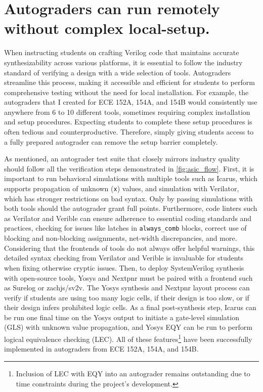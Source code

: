 \section{Autograders can run remotely without complex local-setup.}
\label{section:complex_tool_setups}

When instructing students on crafting Verilog code that maintains accurate synthesizability across various platforms, it is essential to follow the industry standard of verifying a design with a wide selection of tools. Autograders streamline this process, making it accessible and efficient for students to perform comprehensive testing without the need for local installation. For example, the autograders that I created for ECE 152A, 154A, and 154B would consistently use anywhere from 6 to 10 different tools, sometimes requiring complex installation and setup procedures. Expecting students to complete these setup procedures is often tedious and counterproductive. Therefore, simply giving students access to a fully prepared autograder can remove the setup barrier completely.

As mentioned, an autograder test suite that closely mirrors industry quality should follow all the verification steps demonstrated in \autoref{fig:asic_flow}. First, it is important to run behavioral simulations with multiple tools such as Icarus, which supports propagation of unknown (\texttt{x}) values, and simulation with Verilator, which has stronger restrictions on bad syntax. Only by passing simulations with both tools should the autograder grant full points. Furthermore, code linters such as Verilator and Verible can ensure adherence to essential coding standards and practices, checking for issues like latches in \texttt{always_comb} blocks, correct use of blocking and non-blocking assignments, net-width discrepancies, and more. Considering that the frontends of tools do not always offer helpful warnings, this detailed syntax checking from Verilator and Verible is invaluable for students when fixing otherwise cryptic issues. Then, to deploy SystemVerilog synthesis with open-source tools, Yosys and Nextpnr must be paired with a frontend such as Surelog or zachjs/sv2v. The Yosys synthesis and Nextpnr layout process can verify if students are using too many logic cells, if their design is too slow, or if their design infers prohibited logic cells. As a final post-synthesis step, Icarus can be run one final time on the Yosys output to initiate a gate-level simulation (GLS) with unknown value propagation, and Yosys EQY can be run to perform logical equivalence checking (LEC). All of these features\footnote{Inclusion of LEC with EQY into an autograder remains outstanding due to time constraints during the project's development.} have been successfully implemented in autograders from ECE 152A, 154A, and 154B.

